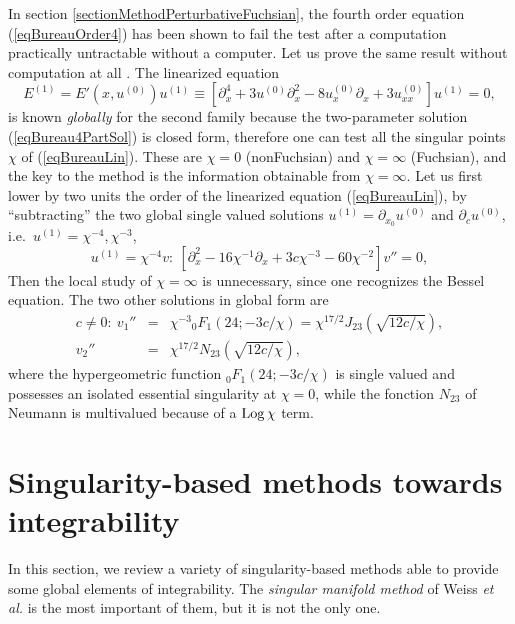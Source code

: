 \documentclass[10pt]{article}
\begin{document}
In section \ref{sectionMethodPerturbativeFuchsian},
the fourth order equation (\ref{eqBureauOrder4}) has been shown to fail
the test after a computation practically untractable without a computer.
Let us prove the same result without computation at all \cite{MC1995}.
The linearized equation
\begin{equation}
E^{(1)} = E'(x,u^{(0)}) u^{(1)} \equiv 
 [              \partial_x^4 
  + 3 u^{(0)}   \partial_x^2
  - 8 u^{(0)}_x \partial_x
  + 3 u^{(0)}_{xx}] u^{(1)} = 0,
\label{eqBureauLin}
\end{equation}
is known \textit{globally} for the second family because 
the two-parameter solution (\ref{eqBureau4PartSol}) is closed form,
therefore one can test all the singular points $\chi$ of (\ref{eqBureauLin}).
These are $\chi=0$ (nonFuchsian) and $\chi=\infty$ (Fuchsian),
and the key to the method is the information obtainable from $\chi=\infty$.
Let us first lower by two units the order of the linearized equation
(\ref{eqBureauLin}),
by ``subtracting'' 
the two global single valued solutions 
$u^{(1)}=\partial_{x_0} u^{(0)}$ and $\partial_c u^{(0)}$,
i.e.~$u^{(1)}=\chi^{-4},\chi^{-3}$,
\begin{equation}
u^{(1)}=\chi^{-4} v:\
[\partial_x^2 -16 \chi^{-1} \partial_x +3 c \chi^{-3} - 60 \chi^{-2}] v'' = 0,
\end{equation}
Then the local study of $\chi=\infty$ is unnecessary,
since one recognizes the Bessel equation.
The two other solutions in global form are
\begin{eqnarray}
c \not=0:\
v_1''
& = &
\chi^{-3} {}_{0} F_{1} (24;-3c/\chi)
=
\chi^{17/2} J_{23}(\sqrt{12 c/\chi}),
\\
v_2''
& = &
\chi^{17/2} N_{23}(\sqrt{12 c/\chi}),
\end{eqnarray}
where the hypergeometric function ${}_{0} F_{1} (24;-3c/\chi)$
is single valued and possesses an isolated essential singularity at $\chi=0$,
while the fonction $N_{23}$ of Neumann is multivalued because of a
$\mathop{\rm Log}\nolimits \chi$ term.

\section{Singularity-based methods towards integrability}
\label{sectionSingularity-based_methods}

In this section,
we review a variety of singularity-based methods
able to provide some global elements of integrability.
The \textit{singular manifold method} of Weiss \textit{et al.} \cite{WTC} is
the most important of them, but it is not the only one.
\end{document}
